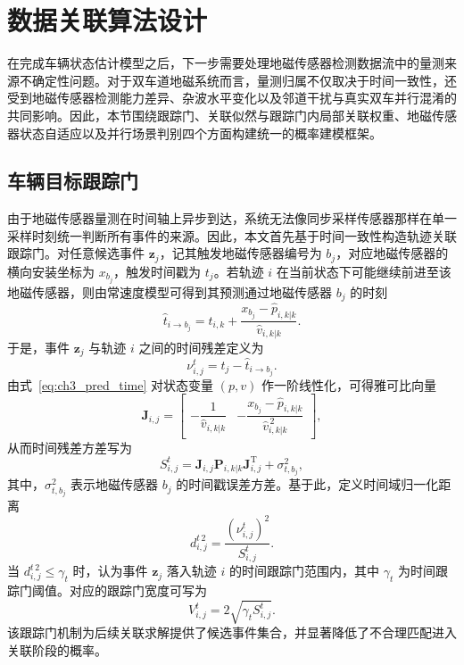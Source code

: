 \documentclass{xdupgthesis}
\begin{document}
\section{数据关联算法设计}
\label{sec:ch3_association}

在完成车辆状态估计模型之后，下一步需要处理地磁传感器检测数据流中的量测来源不确定性问题。对于双车道地磁系统而言，量测归属不仅取决于时间一致性，还受到地磁传感器检测能力差异、杂波水平变化以及邻道干扰与真实双车并行混淆的共同影响。因此，本节围绕跟踪门、关联似然与跟踪门内局部关联权重、地磁传感器状态自适应以及并行场景判别四个方面构建统一的概率建模框架。


\subsection{车辆目标跟踪门}

由于地磁传感器量测在时间轴上异步到达，系统无法像同步采样传感器那样在单一采样时刻统一判断所有事件的来源。因此，本文首先基于时间一致性构造轨迹关联跟踪门。对任意候选事件 $\mathbf z_j$，记其触发地磁传感器编号为 $b_j$，对应地磁传感器的横向安装坐标为 $x_{b_j}$，触发时间戳为 $t_j$。若轨迹 $i$ 在当前状态下可能继续前进至该地磁传感器，则由常速度模型可得到其预测通过地磁传感器 $b_j$ 的时刻
\begin{equation}
	\hat t_{i\rightarrow b_j}
	=
	t_{i,k}+\frac{x_{b_j}-\hat p_{i,k|k}}{\hat v_{i,k|k}}.
	\label{eq:ch3_pred_time}
\end{equation}
于是，事件 $\mathbf z_j$ 与轨迹 $i$ 之间的时间残差定义为
\begin{equation}
	\nu^{t}_{i,j}=t_j-\hat t_{i\rightarrow b_j}.
	\label{eq:ch3_time_residual}
\end{equation}
由式~\eqref{eq:ch3_pred_time} 对状态变量 $(p,v)$ 作一阶线性化，可得雅可比向量
\begin{equation}
	\mathbf J_{i,j}
	=
	\begin{bmatrix}
		-\dfrac{1}{\hat v_{i,k|k}} & -\dfrac{x_{b_j}-\hat p_{i,k|k}}{\hat v_{i,k|k}^{\,2}}
	\end{bmatrix},
	\label{eq:ch3_time_jacobian}
\end{equation}
从而时间残差方差写为
\begin{equation}
	S^{t}_{i,j}=\mathbf J_{i,j}\mathbf P_{i,k|k}\mathbf J_{i,j}^{\mathrm T}+\sigma_{t,b_j}^{2},
	\label{eq:ch3_time_var}
\end{equation}
其中，$\sigma_{t,b_j}^{2}$ 表示地磁传感器 $b_j$ 的时间戳误差方差。基于此，定义时间域归一化距离
\begin{equation}
	d^{t\,2}_{i,j}=\frac{\left(\nu^{t}_{i,j}\right)^2}{S^{t}_{i,j}}.
	\label{eq:ch3_time_maha}
\end{equation}
当 $d^{t\,2}_{i,j}\le \gamma_t$ 时，认为事件 $\mathbf z_j$ 落入轨迹 $i$ 的时间跟踪门范围内，其中 $\gamma_t$ 为时间跟踪门阈值。对应的跟踪门宽度可写为
\begin{equation}
	V^{t}_{i,j}=2\sqrt{\gamma_t S^{t}_{i,j}}.
	\label{eq:ch3_gate_width_time}
\end{equation}
该跟踪门机制为后续关联求解提供了候选事件集合，并显著降低了不合理匹配进入关联阶段的概率。
\end{document}
